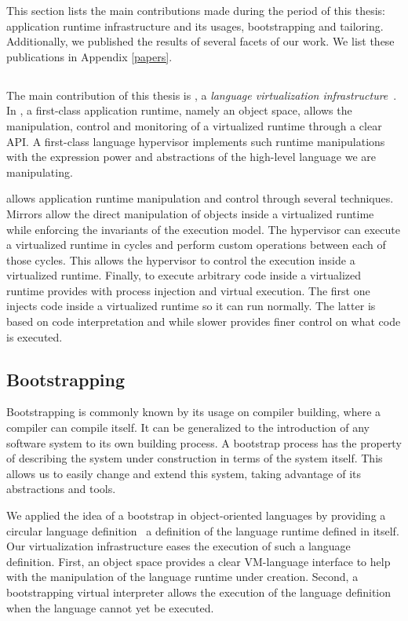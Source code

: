 This section lists the main contributions made during the period of this thesis: \Vtt application runtime infrastructure and its usages, bootstrapping and tailoring. Additionally, we published the results of several facets of our work. We list these publications in Appendix \ref{papers}.

\subsection{\Vtt}
The main contribution of this thesis is \Vtt, a \emph{language virtualization infrastructure}~\cite{Poli13a}. In \Vtt, a first-class application runtime, namely an object space, allows the manipulation, control and monitoring of a virtualized runtime through a clear API. A first-class language hypervisor implements such runtime manipulations with the expression power and abstractions of the high-level language we are manipulating.

\Vtt allows application runtime manipulation and control through several techniques. Mirrors allow the direct manipulation of objects inside a virtualized runtime while enforcing the invariants of the \VM execution model. The hypervisor can execute a virtualized runtime in cycles and perform custom operations between each of those cycles. This allows the hypervisor to control the execution inside a virtualized runtime. Finally, to execute arbitrary code inside a virtualized runtime \Vtt provides with process injection and virtual execution. The first one injects code inside a virtualized runtime so it can run normally. The latter is based on code interpretation and while slower provides finer control on what code is executed. 

\subsection{Bootstrapping}
Bootstrapping is commonly known by its usage on compiler building, where a compiler can compile itself.
It can be generalized to the introduction of any software system to its own building process.
A bootstrap process has the property of describing the system under construction in terms of the system itself. This allows us to easily change and extend this system, taking advantage of its abstractions and tools.

We applied the idea of a bootstrap in object-oriented languages by providing a circular language definition~\cite{Poli14c} \ie a definition of the language runtime defined in itself.
Our virtualization infrastructure eases the execution of such a language definition. First, an object space provides a clear VM-language interface to help with the manipulation of the language runtime under creation. Second, a bootstrapping virtual interpreter allows the execution of the language definition when the language cannot yet be executed.

